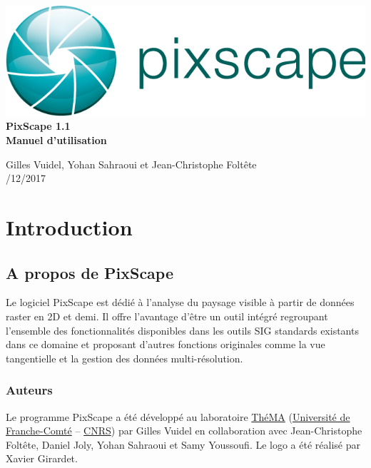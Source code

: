 \documentclass{report}
\begin{document}
 \begin{titlepage}
	
	\centering
	\includegraphics[scale=0.5]{img/logo.png}\\
	
	\bigskip
	\bigskip
	\bigskip	
	{\Huge
		\bfseries
		PixScape 1.1\\
		\bigskip
		Manuel d’utilisation\\
	}
	\bigskip
	\bigskip
	\bigskip
	\bigskip
	\bigskip
	
	{\Large		
		Gilles Vuidel, Yohan Sahraoui et Jean-Christophe Foltête\\
		/12/2017\\
	}
	
\end{titlepage}

\setcounter{tocdepth}{2}
\tableofcontents

\pagebreak

\chapter{Introduction}

\section{A propos de PixScape}

Le logiciel PixScape est dédié à l'analyse du paysage visible à partir de données raster en 2D et demi. Il offre l’avantage d’être un outil intégré regroupant l’ensemble des fonctionnalités disponibles dans les outils SIG standards existants dans ce domaine et proposant d’autres fonctions originales comme la vue tangentielle et la gestion des données multi-résolution.


\subsection{Auteurs}
Le programme PixScape a été développé au laboratoire \href{http://thema.univ-fcomte.fr}{ThéMA} (\href{http://www.univ-fcomte.fr}{Université de Franche-Comté} – \href{http://www.cnrs.fr}{CNRS}) par Gilles Vuidel en collaboration avec Jean-Christophe Foltête, Daniel Joly, Yohan Sahraoui et Samy Youssoufi. Le logo a été réalisé par Xavier Girardet.
\end{document}
